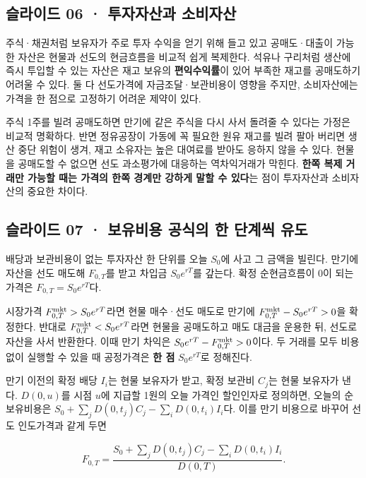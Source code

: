 \documentclass[11pt,a4paper]{article}
\begin{document}
\subsection{슬라이드 06 · 투자자산과 소비자산}
주식·채권처럼 보유자가 주로 투자 수익을 얻기 위해 들고 있고 공매도·대출이 가능한 자산은 현물과 선도의 현금흐름을 비교적 쉽게 복제한다. 석유나 구리처럼 생산에 즉시 투입할 수 있는 자산은 재고 보유의 \textbf{편익수익률}이 있어 부족한 재고를 공매도하기 어려울 수 있다. 둘 다 선도가격에 자금조달·보관비용이 영향을 주지만, 소비자산에는 가격을 한 점으로 고정하기 어려운 제약이 있다.\par

주식 1주를 빌려 공매도하면 만기에 같은 주식을 다시 사서 돌려줄 수 있다는 가정은 비교적 명확하다. 반면 정유공장이 가동에 꼭 필요한 원유 재고를 빌려 팔아 버리면 생산 중단 위험이 생겨, 재고 소유자는 높은 대여료를 받아도 응하지 않을 수 있다. 현물을 공매도할 수 없으면 선도 과소평가에 대응하는 역차익거래가 막힌다. \textbf{한쪽 복제 거래만 가능할 때는 가격의 한쪽 경계만 강하게 말할 수 있다}는 점이 투자자산과 소비자산의 중요한 차이다.\par

\subsection{슬라이드 07 · 보유비용 공식의 한 단계씩 유도}
배당과 보관비용이 없는 투자자산 한 단위를 오늘 $S_0$에 사고 그 금액을 빌린다. 만기에 자산을 선도 매도해 $F_{0,T}$를 받고 차입금 $S_0e^{rT}$를 갚는다. 확정 순현금흐름이 0이 되는 가격은 $F_{0,T}=S_0e^{rT}$다.\par

시장가격 $F^{\rm mkt}_{0,T}>S_0e^{rT}$라면 현물 매수·선도 매도로 만기에 $F^{\rm mkt}_{0,T}-S_0e^{rT}>0$을 확정한다. 반대로 $F^{\rm mkt}_{0,T}<S_0e^{rT}$라면 현물을 공매도하고 매도 대금을 운용한 뒤, 선도로 자산을 사서 반환한다. 이때 만기 차익은 $S_0e^{rT}-F^{\rm mkt}_{0,T}>0$이다. 두 거래를 모두 비용 없이 실행할 수 있을 때 공정가격은 \textbf{한 점} $S_0e^{rT}$로 정해진다.\par

만기 이전의 확정 배당 $I_i$는 현물 보유자가 받고, 확정 보관비 $C_j$는 현물 보유자가 낸다. $D(0,u)$를 시점 $u$에 지급할 1원의 오늘 가격인 할인인자로 정의하면, 오늘의 순보유비용은 $S_0+\sum_jD(0,t_j)C_j-\sum_iD(0,t_i)I_i$다. 이를 만기 비용으로 바꾸어 선도 인도가격과 같게 두면\par

\[
F_{0,T}=\frac{S_0+\sum_jD(0,t_j)C_j-\sum_iD(0,t_i)I_i}{D(0,T)}.
\]
\end{document}
